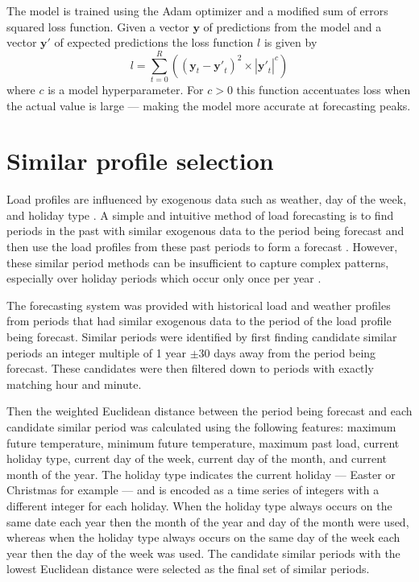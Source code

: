 The model is trained using the Adam optimizer \cite{Kingma2014} and a modified sum of errors squared loss function.
Given a vector $\boldsymbol{y}$ of predictions from the model and a vector $\boldsymbol{y'}$ of expected predictions the loss function $l$ is given by 
\begin{equation}
l = \sum_{t=0}^{R}((\boldsymbol{y}_t - \boldsymbol{y'}_t)^2 \times |\boldsymbol{y'}_t|^c)
\end{equation}
where $c$ is a model hyperparameter.
For $c>0$ this function accentuates loss when the actual value is large --- making the model more accurate at forecasting peaks.


\section{Similar profile selection}
Load profiles are influenced by exogenous data such as weather, day of the week, and holiday type \cite{Weron2006}.
A simple and intuitive method of load forecasting is to find periods in the past with similar exogenous data to the period being forecast and then use the load profiles from these past periods to form a forecast \cite{Senjyu1998}.
However, these similar period methods can be insufficient to capture complex patterns, especially over holiday periods which occur only once per year \cite{Chen2010}.


The forecasting system was provided with historical load and weather profiles from periods that had similar exogenous data to the period of the load profile being forecast.
Similar periods were identified by first finding candidate similar periods an integer multiple of 1 year $\pm$30 days away from the period being forecast.
These candidates were then filtered down to periods with exactly matching hour and minute.

Then the weighted Euclidean distance between the period being forecast and each candidate similar period was calculated using the following features: 
maximum future temperature, 
minimum future temperature,
maximum past load,
current holiday type, 
current day of the week,
current day of the month, and
current month of the year.
The holiday type indicates the current holiday --- Easter or Christmas for example --- and is encoded as a time series of integers with a different integer for each holiday.
When the holiday type always occurs on the same date each year then the month of the year and day of the month were used, whereas when the holiday type always occurs on the same day of the week each year then the day of the week was used.
The candidate similar periods with the lowest Euclidean distance were selected as the final set of similar periods.


